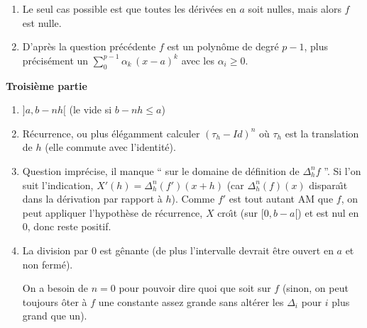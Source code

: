 \documentclass[a4paper]{article}
\begin{document}
\begin{enumerate}
\begin{enumerate}
\textsc{remarque :} 

\textsc{remarque :} la fin de la d\'emonstration est exactement celle qui
permet d'avoir l'analycit\'e d'une somme de s\'erie enti\`ere dans son
disque ouvert de convergence.


\item

	Le seul cas possible est que toutes les d\'eriv\'ees en $a$ soit nulles,
mais alors $f$ est nulle.

\item

	D'apr\`es la question pr\'ec\'edente $f$ est un polyn\^ome de degr\'e
$p-1$, plus pr\'ecis\'ement un 
$\sum_0 ^{p-1} \alpha_k\, (x-a)^k$ avec les $\alpha_i\ge0$.
	

	
\end{enumerate}

\vspace*{3em}
\centerline{\textbf{\Large Troisi\`eme partie}}
\begin{enumerate}
\item

  $]a,b-nh[$ (le vide si $b-nh\le a$)

\item

	R\'ecurrence, ou plus \'el\'egamment calculer $(\tau_h-Id)^n$ o\`u $\tau_h$
est la translation de $h$ (elle commute avec l'identit\'e).

\item

	Question impr\'ecise, il manque `` sur le domaine de d\'efinition de
$\Delta_h^nf$ ''. Si l'on suit l'indication,
$X'(h)=\Delta_h^n(f')(x+h)$ (car $\Delta_h^n(f)(x)$ dispara\^{\i}t dans la
d\'erivation par rapport \`a $h$). Comme $f'$ est tout autant AM que $f$,
on peut appliquer l'hypoth\`ese de r\'ecurrence, $X$ cro\^{\i}t (sur $[0,b-a[$)
et est nul en $0$, donc reste positif.

\item

	La division par 0 est g\^enante (de plus l'intervalle devrait \^etre
ouvert en $a$ et non ferm\'e).

	On a besoin de $n=0$ pour pouvoir dire quoi que soit sur $f$ (sinon,
on peut toujours \^oter \`a $f$ une constante assez grande sans alt\'erer les
$\Delta_i$ pour $i$ plus grand que un).


\end{enumerate}
\end{enumerate}
\end{document}
